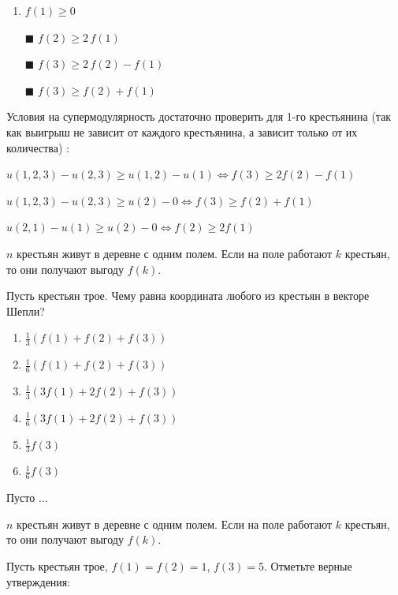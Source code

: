 	\begin{enumerate}[label=$\square$]
		\item $f(1) \geq 0$
		\item[$\blacksquare$] $f(2) \geq 2\, f(1)$
		\item[$\blacksquare$] $f(3) \geq 2\,f(2) - f(1)$
		\item[$\blacksquare$] $f(3) \geq f(2) + f(1)$
	\end{enumerate}

	\solution
	Условия на супермодулярность достаточно проверить для 1-го крестьянина (так как выигрыш не зависит от каждого крестьянина, а зависит только от их количества) :
	
	$u(1,2,3)-u(2,3) \geq u(1,2) - u(1) \Leftrightarrow f(3) \geq 2f(2)-f(1)$
	
	$u(1,2,3)-u(2,3) \geq u(2) - 0 \Leftrightarrow f(3) \geq f(2)+f(1)$
	
	$u(2,1)-u(1) \geq u(2) - 0 \Leftrightarrow f(2) \geq 2f(1)$
	
	\task
	$n$ крестьян живут в деревне с одним полем. Если на поле работают $k$ крестьян, то они получают выгоду $f(k)$.
	
	Пусть крестьян трое. Чему равна координата любого из крестьян в векторе Шепли?
	
	\begin{enumerate}[label=$\circ$]
		\item $\frac{1}{3} \left(f(1)+f(2)+f(3)\right)$ \vspace{1mm}
		\item $\frac{1}{6}\left(f(1)+f(2)+f(3)\right)$\vspace{1mm}
		\item $\frac{1}{3}(3f(1)+2f(2)+f(3))$\vspace{1mm}
		\item $\frac{1}{6}(3f(1)+2f(2)+f(3))$\vspace{1mm}
		\item $\frac{1}{3}f(3)$\vspace{1mm}
		\item $\frac{1}{6}f(3)$\vspace{1mm}
	\end{enumerate}

	\solution
	Пусто $\dots$
	
	\task
	$n$ крестьян живут в деревне с одним полем. Если на поле работают $k$ крестьян, то они получают выгоду $f(k)$.
	
	Пусть крестьян трое, $f(1)=f(2)=1$, $f(3)=5$. Отметьте верные утверждения:
	
